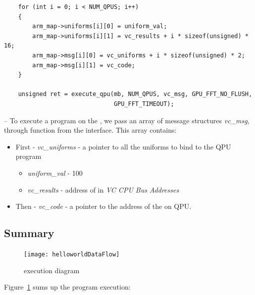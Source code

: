 \begin{lstlisting}
    for (int i = 0; i < NUM_QPUS; i++)
    {
        arm_map->uniforms[i][0] = uniform_val;
        arm_map->uniforms[i][1] = vc_results + i * sizeof(unsigned) * 16;
        arm_map->msg[i][0] = vc_uniforms + i * sizeof(unsigned) * 2;
        arm_map->msg[i][1] = vc_code;
    }

    unsigned ret = execute_qpu(mb, NUM_QPUS, vc_msg, GPU_FFT_NO_FLUSH,
                               GPU_FFT_TIMEOUT);
\end{lstlisting}
-- To execute a \qpu{} program on the , we pass an array of message structures \emph{vc\_msg}, through  function from the  interface. This array contains:
\begin{itemize}
	\item First - \emph{vc\_uniforms} - a pointer to all the uniforms to bind to the QPU program
	\begin{itemize}
		\item \emph{uniform\_val} - 100
		\item \emph{vc\_results} - address of  in \emph{VC CPU Bus Addresses}
	\end{itemize}
\item Then - \emph{vc\_code} - a pointer to the address of the  on QPU.
\end{itemize}


\subsection{Summary}

\begin{figure}[!htbp]
	\centering
	\texttt{[image: helloworldDataFlow]}
	\caption{ execution diagram}
	\label{flowFigure}
\end{figure}
\FloatBarrier


Figure~\ref{flowFigure} sums up the  program execution:

